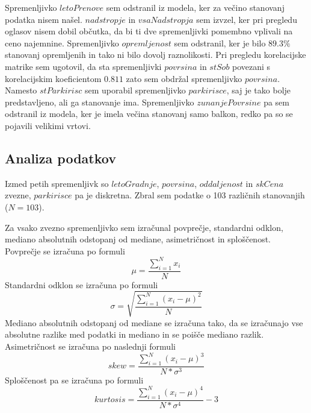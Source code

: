 \documentclass[a4paper, 12pt]{article}
\begin{document}
Spremenljivko $ letoPrenove $ sem odstranil iz modela, ker za večino
stanovanj podatka nisem našel. $ nadstropje $ in $ vsaNadstropja $
sem izvzel, ker pri pregledu oglasov nisem dobil občutka, da bi ti dve
spremenljivki pomembno vplivali na ceno najemnine. Spremenljivko
$ opremljenost $ sem odstranil, ker je bilo $ 89.3\% $ stanovanj
opremljenih in tako ni bilo dovolj raznolikosti. Pri pregledu korelacijske
matrike sem ugotovil, da sta spremenljivki $ povrsina $ in
$ stSob $ povezani s korelacijskim koeficientom $ 0.811 $ zato sem obdržal
spremenljivko $ povrsina $. Namesto $ stParkirisc $ sem uporabil
spremenljivko $ parkirisce $, saj je tako bolje predstavljeno, ali ga
stanovanje ima. Spremenljivko $ zunanjePovrsine $ pa sem  odstranil iz
modela, ker je imela večina stanovanj samo balkon, redko pa so se pojavili
velikimi vrtovi.

\subsection{Analiza podatkov}

Izmed petih spremenljivk so $ letoGradnje $, $ povrsina $,
$ oddaljenost $ in $ skCena $ zvezne, $ parkirisce $ pa je
diskretna. Zbral sem podatke o 103 različnih stanovanjih ($ N = 103 $).

Za vsako zvezno spremenljivko sem izračunal povprečje, standardni odklon,
mediano absolutnih odstopanj od mediane, asimetričnost in sploščenost.
Povprečje se izračuna po formuli
\begin{equation}
	\mu = \frac{\sum\limits_{i=1}^{N} x_{i}}{N}
\end{equation}
Standardni odklon se izračuna po formuli
\begin{equation}
	\sigma = \sqrt{\frac{\sum\limits_{i=1}^{N}\left(x_{i}-\mu\right)^{2}}{N}}
\end{equation}
Mediano absolutnih odstopanj od mediane se izračuna tako, da se izračunajo vse
absolutne razlike med podatki in mediano in se poišče mediano razlik.
\newline
Asimetričnost se izračuna po naslednji formuli
\begin{equation}
	skew = \frac{\sum\limits_{i=1}^{N}\left(x_{i}-\mu\right)^{3}}{N*\sigma^{3}}
\end{equation}
Sploščenost pa se izračuna po formuli
\begin{equation}
	kurtosis = \frac{\sum\limits_{i=1}^{N}\left(x_{i}-\mu\right)^{4}}{N*\sigma^{4}}-3
\end{equation}
\end{document}
